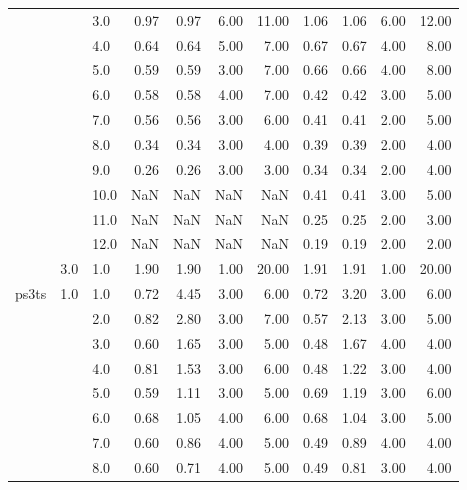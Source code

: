 \begin{tabular}{lllrrrrrrrr}
      &     & 3.0  &       0.97 &      0.97 & 6.00 &  11.00 &       1.06 &      1.06 & 6.00 &  12.00 \\
      &     & 4.0  &       0.64 &      0.64 & 5.00 &   7.00 &       0.67 &      0.67 & 4.00 &   8.00 \\
      &     & 5.0  &       0.59 &      0.59 & 3.00 &   7.00 &       0.66 &      0.66 & 4.00 &   8.00 \\
      &     & 6.0  &       0.58 &      0.58 & 4.00 &   7.00 &       0.42 &      0.42 & 3.00 &   5.00 \\
      &     & 7.0  &       0.56 &      0.56 & 3.00 &   6.00 &       0.41 &      0.41 & 2.00 &   5.00 \\
      &     & 8.0  &       0.34 &      0.34 & 3.00 &   4.00 &       0.39 &      0.39 & 2.00 &   4.00 \\
      &     & 9.0  &       0.26 &      0.26 & 3.00 &   3.00 &       0.34 &      0.34 & 2.00 &   4.00 \\
      &     & 10.0 &        NaN &       NaN &  NaN &    NaN &       0.41 &      0.41 & 3.00 &   5.00 \\
      &     & 11.0 &        NaN &       NaN &  NaN &    NaN &       0.25 &      0.25 & 2.00 &   3.00 \\
      &     & 12.0 &        NaN &       NaN &  NaN &    NaN &       0.19 &      0.19 & 2.00 &   2.00 \\
      & 3.0 & 1.0  &       1.90 &      1.90 & 1.00 &  20.00 &       1.91 &      1.91 & 1.00 &  20.00 \\
ps3ts & 1.0 & 1.0  &       0.72 &      4.45 & 3.00 &   6.00 &       0.72 &      3.20 & 3.00 &   6.00 \\
      &     & 2.0  &       0.82 &      2.80 & 3.00 &   7.00 &       0.57 &      2.13 & 3.00 &   5.00 \\
      &     & 3.0  &       0.60 &      1.65 & 3.00 &   5.00 &       0.48 &      1.67 & 4.00 &   4.00 \\
      &     & 4.0  &       0.81 &      1.53 & 3.00 &   6.00 &       0.48 &      1.22 & 3.00 &   4.00 \\
      &     & 5.0  &       0.59 &      1.11 & 3.00 &   5.00 &       0.69 &      1.19 & 3.00 &   6.00 \\
      &     & 6.0  &       0.68 &      1.05 & 4.00 &   6.00 &       0.68 &      1.04 & 3.00 &   5.00 \\
      &     & 7.0  &       0.60 &      0.86 & 4.00 &   5.00 &       0.49 &      0.89 & 4.00 &   4.00 \\
      &     & 8.0  &       0.60 &      0.71 & 4.00 &   5.00 &       0.49 &      0.81 & 3.00 &   4.00 \\

\end{tabular}
